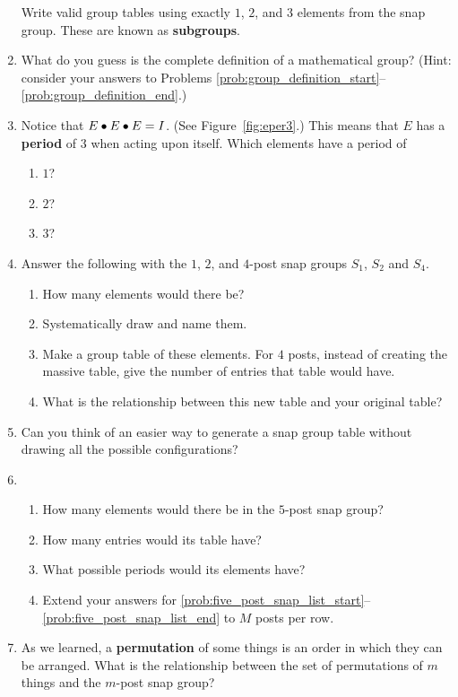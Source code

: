 \documentclass[../gatm.tex]{subfiles}
\begin{document}
\begin{enumerate}
	      Write valid group tables using exactly $1$, $2$, and $3$ elements from the snap group. These are known as \textbf{subgroups}.\label{prob:group_definition_end}
	\item What do you guess is the complete definition of a mathematical group?
	      (Hint: consider your answers to Problems \ref{prob:group_definition_start}--\ref{prob:group_definition_end}.)
	\item Notice that $E\bullet E\bullet E=I$. (See Figure~\ref{fig:eper3}.)
	      This means that $E$ has a \textbf{period} of $3$ when acting upon itself.
	      Which elements have a period of
	      \begin{multicols}{3}
		      \begin{enumerate}
			      \item $1$?
			      \item $2$?
			      \item $3$?
		      \end{enumerate}
	      \end{multicols}
	\item Answer the following with the $1$, $2$, and $4$-post snap groups $S_1$, $S_2$ and $S_4$.\begin{enumerate}
		      \item How many elements would there be?
		      \item Systematically draw and name them.
		      \item Make a group table of these elements.
		            For $4$ posts, instead of creating the massive table, give the number of entries that table would have.
		      \item What is the relationship between this new table and your original table?
	      \end{enumerate}
	\item Can you think of an easier way to generate a snap group table without drawing all the possible configurations?
	\item \begin{enumerate}
		      \item How many elements would there be in the $5$-post snap group? \label{prob:five_post_snap_list_start}
		      \item How many entries would its table have?
		      \item What possible periods would its elements have? \label{prob:five_post_snap_list_end}
		      \item Extend your answers for \ref{prob:five_post_snap_list_start}--\ref{prob:five_post_snap_list_end} to $M$ posts per row.
	      \end{enumerate}
	\item As we learned, a \textbf{permutation} of some things is an order in which they can be arranged.
	      What is the relationship between the set of permutations of $m$ things and the $m$-post snap group?
\end{enumerate}
\end{document}
